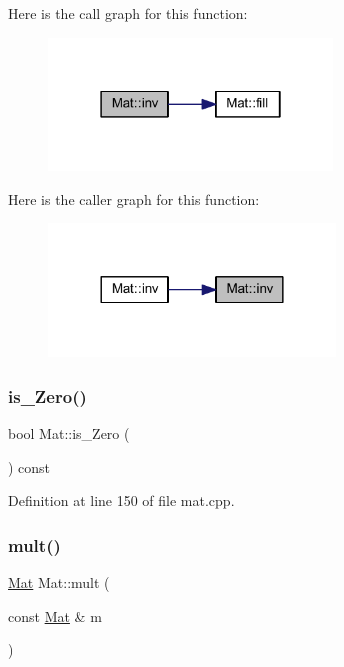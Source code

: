 Here is the call graph for this function\+:
\nopagebreak
\begin{figure}[H]
\begin{center}
\leavevmode
\includegraphics[width=214pt]{class_mat_a8655dfdd2bcf36aeb250f71b746632c3_cgraph}
\end{center}
\end{figure}
Here is the caller graph for this function\+:
\nopagebreak
\begin{figure}[H]
\begin{center}
\leavevmode
\includegraphics[width=216pt]{class_mat_a8655dfdd2bcf36aeb250f71b746632c3_icgraph}
\end{center}
\end{figure}
\mbox{\label{class_mat_a1faaf46898f55a59d5e27baf7c4a028b}} 
\subsubsection{\texorpdfstring{is\_Zero()}{is\_Zero()}}
{\footnotesize\ttfamily bool Mat\+::is\+\_\+\+Zero (\begin{DoxyParamCaption}{ }\end{DoxyParamCaption}) const}



Definition at line 150 of file mat.\+cpp.

\mbox{\label{class_mat_a03d3322fef7fcc6d52fe141171c5fa04}} 
\subsubsection{\texorpdfstring{mult()}{mult()}}
{\footnotesize\ttfamily \mbox{\hyperlink{class_mat}{Mat}} Mat\+::mult (\begin{DoxyParamCaption}\item[{const \mbox{\hyperlink{class_mat}{Mat}} \&}]{m }\end{DoxyParamCaption})}



